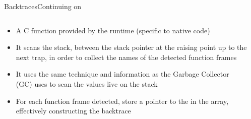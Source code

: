 \begin{frame}{Backtraces}{Continuing on }
  \begin{columns}[c]
    \begin{column}{0.5\textwidth}
      \minipage[c][0.75\textheight][s]{\columnwidth}
      \begin{itemize}
          \color{gray}
        \item A C function provided by the runtime (specific to native code)
        \item It scans the stack, between the stack pointer at the raising point up to the next trap, in order to collect the names of the detected function frames
        \item It uses the same technique and information as the Garbage Collector (GC) uses to scan the values live on the stack
      \end{itemize}
      \begin{itemize}
        \item For each function frame detected, store a pointer to the  in the  array, effectively constructing the backtrace
      \end{itemize}
      \vfill
      \endminipage
    \end{column}
    \begin{column}{0.5\textwidth}
      \raggedleft
    \end{column}
  \end{columns}
\end{frame}

